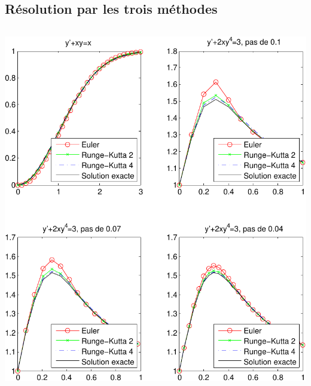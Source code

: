 \documentclass[10pt]{article}
\begin{document}
  \subsection{Résolution par les trois méthodes}
   \inputminted[linenos]{matlab}{resolution.m}
   \begin{center}
    \includegraphics{EquaDiffs}
   \end{center}
\end{document}
